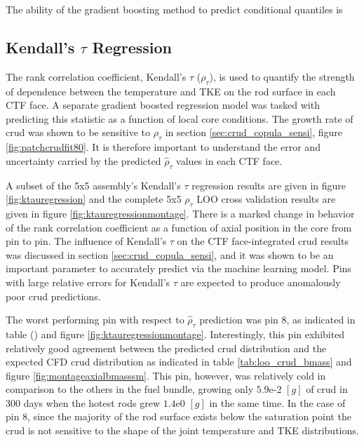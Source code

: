 The ability of the gradient boosting method to predict conditional quantiles is

\subsection{Kendall's $\tau$ Regression}

The rank correlation coefficient, Kendall's $\tau$ ($\rho_\tau$), is used to quantify the strength of dependence between the temperature and TKE on the rod surface in each CTF face.  A separate gradient boosted regression model was tasked with predicting this statistic as a function of local core conditions.   The growth rate of crud was shown to be sensitive to   $\rho_\tau$ in section \ref{sec:crud_copula_sensi}, figure \ref{fig:patchcrudfit80}.  It is therefore important to understand the error and uncertainty carried by the predicted $\hat \rho_\tau$ values in each CTF face.

A subset of the 5x5 assembly's Kendall's $\tau$ regression results are given in figure \ref{fig:ktauregression} and the complete 5x5 $\rho_\tau$ LOO cross validation results are given in figure \ref{fig:ktauregressionmontage}.  There is a marked change in behavior of the rank correlation coefficient as a function of axial position in the core from pin to pin.  The influence of Kendall's $\tau$ on the CTF face-integrated crud results was discussed in section \ref{sec:crud_copula_sensi}, and it was shown to be an important parameter to accurately predict via the machine learning model.  Pins with large relative errors for Kendall's $\tau$ are expected to produce anomalously poor crud predictions.

The worst performing pin with respect to $\hat \rho_\tau$ prediction was pin 8, as indicated in table () and figure \ref{fig:ktauregressionmontage}.  Interestingly, this pin exhibited relatively good agreement between the predicted crud distribution and the expected CFD crud distribution as indicated in table \ref{tab:loo_crud_bmass} and figure \ref{fig:montageaxialbmasssm}.  This pin, however, was relatively cold in comparison to the others in the fuel bundle, growing only $5.9$e-2 $[g]$ of crud in 300 days when the hotest rods grew $1.4$e0 $[g]$ in the same time.  In the case of pin 8, since the majority of the rod surface exists below the saturation point the crud is not sensitive to the shape of the joint temperature and TKE distributions.

